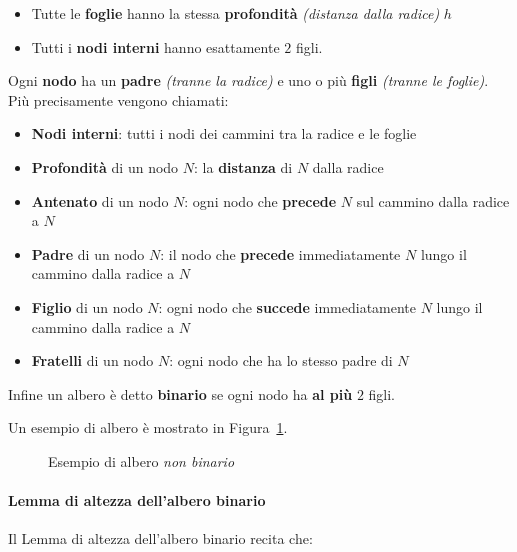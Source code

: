 \documentclass[italian, 10pt]{article}
\begin{document}
\begin{itemize}
  \item Tutte le \textbf{foglie} hanno la stessa \textbf{profondità} \textit{(distanza dalla radice)} \(h\)
  \item Tutti i \textbf{nodi interni} hanno esattamente \(2\) figli.
\end{itemize}

\bigskip
Ogni \textbf{nodo} ha un \textbf{padre} \textit{(tranne la radice)} e uno o più \textbf{figli} \textit{(tranne le foglie)}.
Più precisamente vengono chiamati:

\begin{itemize}
  \item \textbf{Nodi interni}: tutti i nodi dei cammini tra la radice e le foglie
  \item \textbf{Profondità} di un nodo \(N\): la \textbf{distanza} di \(N\) dalla radice
  \item \textbf{Antenato} di un nodo \(N\):  ogni nodo che \textbf{precede} \(N\) sul cammino dalla radice a \(N\)
  \item \textbf{Padre} di un nodo \(N\): il nodo che \textbf{precede} immediatamente \(N\) lungo il cammino dalla radice a \(N\)
  \item \textbf{Figlio} di un nodo \(N\): ogni nodo che \textbf{succede} immediatamente \(N\) lungo il cammino dalla radice a \(N\)
  \item \textbf{Fratelli} di un nodo \(N\): ogni nodo che ha lo stesso padre di \(N\)
\end{itemize}

Infine un albero è detto \textbf{binario} se ogni nodo ha \textbf{al più} \(2\) figli.

\bigskip
Un esempio di albero è mostrato in Figura~\ref{fig:esempio-di-albero}.

\begin{figure}[htbp]
  \bigskip
  \centering
  \caption{Esempio di albero \textit{non binario}}
  \label{fig:esempio-di-albero}
  \bigskip
\end{figure}

\paragraph{Lemma di altezza dell'albero binario}
\label{par:lemma-altezza-albero-binario}

Il Lemma di altezza dell'albero binario recita che:

\end{document}
